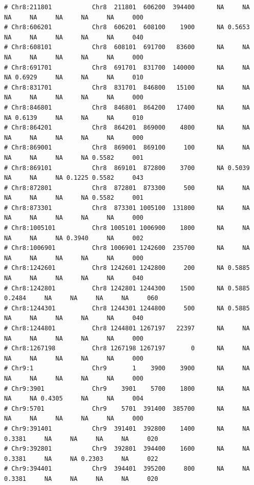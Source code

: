 \documentclass{article}\usepackage[]{graphicx}\usepackage[]{color}
\makeatletter
\newenvironment{kframe}{%
 \def\at@end@of@kframe{}%
 \ifinner\ifhmode%
  \def\at@end@of@kframe{\end{minipage}}%
  \begin{minipage}{\columnwidth}%
 \fi\fi%
 \def\FrameCommand##1{\hskip\@totalleftmargin \hskip-\fboxsep
 \colorbox{shadecolor}{##1}\hskip-\fboxsep
     \hskip-\linewidth \hskip-\@totalleftmargin \hskip\columnwidth}%
 \MakeFramed {\advance\hsize-\width
   \@totalleftmargin\z@ \linewidth\hsize
   \@setminipage}}%
 {\par\unskip\endMakeFramed%
 \at@end@of@kframe}
\newenvironment{knitrout}{}{} %
\makeatother
\begin{document}
\begin{knitrout}
\begin{kframe}
\begin{verbatim}
# Chr8:211801           Chr8  211801  606200  394400      NA     NA     NA     NA     NA     NA     NA     000
# Chr8:606201           Chr8  606201  608100    1900      NA 0.5653     NA     NA     NA     NA     NA     040
# Chr8:608101           Chr8  608101  691700   83600      NA     NA     NA     NA     NA     NA     NA     000
# Chr8:691701           Chr8  691701  831700  140000      NA     NA     NA 0.6929     NA     NA     NA     010
# Chr8:831701           Chr8  831701  846800   15100      NA     NA     NA     NA     NA     NA     NA     000
# Chr8:846801           Chr8  846801  864200   17400      NA     NA     NA 0.6139     NA     NA     NA     010
# Chr8:864201           Chr8  864201  869000    4800      NA     NA     NA     NA     NA     NA     NA     000
# Chr8:869001           Chr8  869001  869100     100      NA     NA     NA     NA     NA     NA 0.5582     001
# Chr8:869101           Chr8  869101  872800    3700      NA 0.5039     NA     NA     NA 0.1225 0.5582     043
# Chr8:872801           Chr8  872801  873300     500      NA     NA     NA     NA     NA     NA 0.5582     001
# Chr8:873301           Chr8  873301 1005100  131800      NA     NA     NA     NA     NA     NA     NA     000
# Chr8:1005101          Chr8 1005101 1006900    1800      NA     NA     NA     NA     NA 0.3940     NA     002
# Chr8:1006901          Chr8 1006901 1242600  235700      NA     NA     NA     NA     NA     NA     NA     000
# Chr8:1242601          Chr8 1242601 1242800     200      NA 0.5885     NA     NA     NA     NA     NA     040
# Chr8:1242801          Chr8 1242801 1244300    1500      NA 0.5885 0.2484     NA     NA     NA     NA     060
# Chr8:1244301          Chr8 1244301 1244800     500      NA 0.5885     NA     NA     NA     NA     NA     040
# Chr8:1244801          Chr8 1244801 1267197   22397      NA     NA     NA     NA     NA     NA     NA     000
# Chr8:1267198          Chr8 1267198 1267197       0      NA     NA     NA     NA     NA     NA     NA     000
# Chr9:1                Chr9       1    3900    3900      NA     NA     NA     NA     NA     NA     NA     000
# Chr9:3901             Chr9    3901    5700    1800      NA     NA     NA     NA 0.4305     NA     NA     004
# Chr9:5701             Chr9    5701  391400  385700      NA     NA     NA     NA     NA     NA     NA     000
# Chr9:391401           Chr9  391401  392800    1400      NA     NA 0.3381     NA     NA     NA     NA     020
# Chr9:392801           Chr9  392801  394400    1600      NA     NA 0.3381     NA     NA 0.2303     NA     022
# Chr9:394401           Chr9  394401  395200     800      NA     NA 0.3381     NA     NA     NA     NA     020

\end{verbatim}
\end{kframe}
\end{knitrout}
\end{document}
